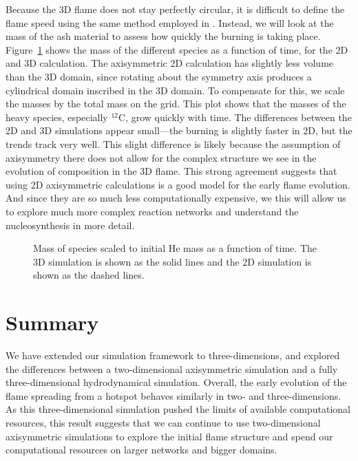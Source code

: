 \documentclass[twocolumn,linenumbers,times,tighten]{aastex631}
\newcommand{\isot}[2]{$^{#2}\mathrm{#1}$}
\begin{document}


Because the 3D flame does not stay perfectly circular, it is difficult
to define the flame speed using the same method employed in
\citet{eiden:2020}.  Instead, we will look at the mass of the ash
material to assess how quickly the burning is taking place.
Figure~\ref{fig:mass_plot} shows the mass of the different species as
a function of time, for the 2D and 3D calculation.  The axisymmetric
2D calculation has slightly less volume than the 3D domain, since
rotating about the symmetry axis produces a cylindrical domain
inscribed in the 3D domain.  To compensate for this, we scale the
masses by the total mass on the grid.  This plot shows that the
masses of the heavy species, especially \isot{C}{12}, grow quickly
with time.  The differences between the 2D and 3D simulations appear
small---the burning is slightly faster in 2D, but the trends track
very well.  This slight difference is likely because the assumption of
axisymmetry there does not allow for the complex structure we see in
the evolution of composition in the 3D flame.  This strong agreement
suggests that using 2D axisymmetric calculations is a good model for
the early flame evolution.  And since they are so much less
computationally expensive, we this will allow us to explore much more
complex reaction networks and understand the nucleosynthesis in more
detail.

\begin{figure}[t]
\centering
{}
\caption{\label{fig:mass_plot} Mass of species scaled to initial He
  mass as a function of time.  The 3D simulation is shown as the solid
  lines and the 2D simulation is shown as the dashed lines.}
\end{figure}

\section{Summary}

We have extended our simulation framework to three-dimensions, and
explored the differences between a two-dimensional axisymmetric
simulation and a fully three-dimensional hydrodynamical simulation.
Overall, the early evolution of the flame spreading from a hotspot
behaves similarly in two- and three-dimensions.  As this
three-dimensional simulation pushed the limits of available
computational resources, this result suggests that we can continue to
use two-dimensional axisymmetric simulations to explore the initial
flame structure and spend our computational resources on larger networks
and bigger domains.
\end{document}
